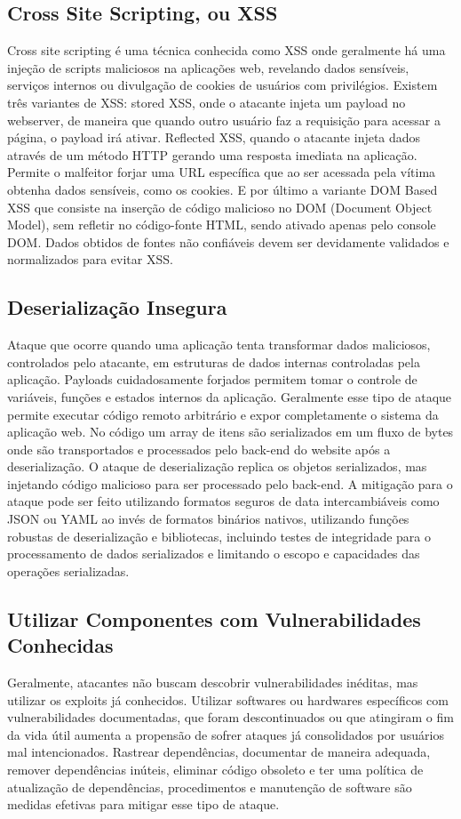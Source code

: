 \subsection{Cross Site Scripting, ou XSS}
Cross site scripting é uma técnica conhecida como XSS onde geralmente há uma injeção de scripts maliciosos na aplicações web, revelando dados sensíveis, serviços internos ou divulgação de cookies de usuários com privilégios.
Existem três variantes de XSS: stored XSS, onde o atacante injeta um payload no webserver, de maneira que quando outro usuário faz a requisição para acessar a página, o payload irá ativar. Reflected XSS, quando o atacante injeta dados através de um método HTTP gerando uma resposta imediata na aplicação. Permite o malfeitor forjar uma URL específica que ao ser acessada pela vítima obtenha dados sensíveis, como os cookies. E por último a variante DOM Based XSS que consiste na inserção de código malicioso no DOM (Document Object Model), sem refletir no código-fonte HTML, sendo ativado apenas pelo console DOM.
Dados obtidos de fontes não confiáveis devem ser devidamente validados e normalizados para evitar XSS.

\subsection{Deserialização Insegura}
Ataque que ocorre quando uma aplicação tenta transformar dados maliciosos, controlados pelo atacante, em estruturas de dados internas controladas pela aplicação. Payloads cuidadosamente forjados permitem tomar o controle de variáveis, funções e estados internos da aplicação. Geralmente esse tipo de ataque permite executar código remoto arbitrário e expor completamente o sistema da aplicação web.
No código um array de itens são serializados em um fluxo de bytes onde são transportados e processados pelo back-end do website após a deserialização.
O ataque de deserialização replica os objetos serializados, mas injetando código malicioso para ser processado pelo back-end.
A mitigação para o ataque pode ser feito utilizando formatos seguros de data intercambiáveis como JSON ou YAML ao invés de formatos binários nativos, utilizando funções robustas de deserialização e bibliotecas, incluindo testes de integridade para o processamento de dados serializados e limitando o escopo e capacidades das operações serializadas.

\subsection{Utilizar Componentes com Vulnerabilidades Conhecidas}
Geralmente, atacantes não buscam descobrir vulnerabilidades inéditas, mas utilizar os exploits já conhecidos.
Utilizar softwares ou hardwares específicos com vulnerabilidades documentadas, que foram descontinuados ou que atingiram o fim da vida útil aumenta a propensão de sofrer ataques já consolidados por usuários mal intencionados.
Rastrear dependências, documentar de maneira adequada, remover dependências inúteis, eliminar código obsoleto e ter uma política de atualização de dependências, procedimentos e manutenção de software são medidas efetivas para mitigar esse tipo de ataque.

